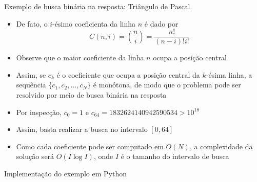 \begin{frame}[fragile]{Exemplo de busca binária na resposta: Triângulo de Pascal}

    \begin{itemize}
        \item De fato, o $i$-ésimo coeficienta da linha $n$ é dado por
        $$
            C(n, i) = \binom{n}{i} = \frac{n!}{(n - i)!i!}
        $$

        \item Observe que o maior coeficiente da linha $n$ ocupa a posição central

        \item Assim, se $c_k$ é o coeficiente que ocupa a posição central da $k$-ésima linha, 
            a sequência $\{ c_1, c_2, \ldots, c_N\}$ é monótona, de modo que o problema pode ser
            resolvido por meio de busca binária na resposta

        \item Por inspecção, $c_0 = 1$ e $c_{64} = 1832624140942590534 > 10^{18}$

        \item Assim, basta realizar a busca no intervalo $[0, 64]$

        \item Como cada coeficiente pode ser computado em $O(N)$, a complexidade da solução será
            $O(I\log I)$, onde $I$ é o tamanho do intervalo de busca
    \end{itemize}

\end{frame}

\begin{frame}[fragile]{Implementação do exemplo em Python}
\end{frame}
